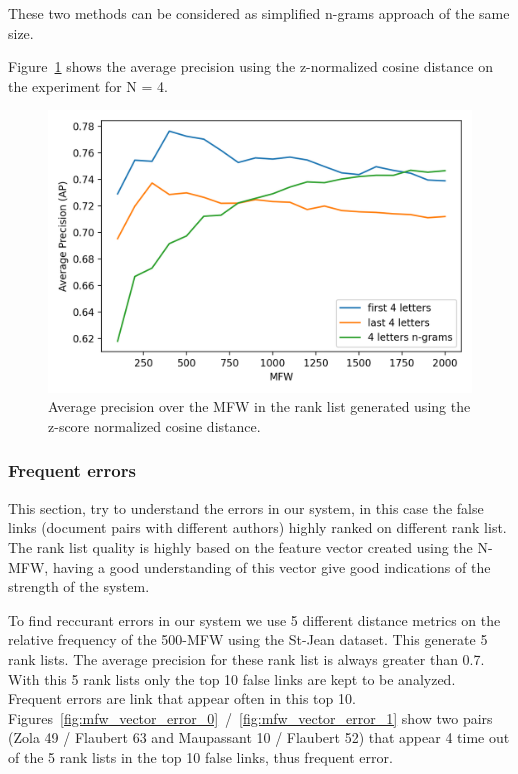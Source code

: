 These two methods can be considered as simplified n-grams approach of the same size.

Figure~\ref{fig:first_last_letters_ngrams} shows the average precision using the z-normalized cosine distance on the experiment for N = 4.

\begin{figure}
  \includegraphics[width=\linewidth]{img/first_last_letters_ngrams.png}
  \caption{Average precision over the MFW in the rank list generated using the z-score normalized cosine distance.}
  \label{fig:first_last_letters_ngrams}
\end{figure}


\subsubsection{Frequent errors}

This section, try to understand the errors in our system, in this case the false links (document pairs with different authors) highly ranked on different rank list.
The rank list quality is highly based on the feature vector created using the N-MFW, having a good understanding of this vector give good indications of the strength of the system.

To find reccurant errors in our system we use 5 different distance metrics on the relative frequency of the 500-MFW using the St-Jean dataset.
This generate 5 rank lists.
The average precision for these rank list is always greater than 0.7.
With this 5 rank lists only the top 10 false links are kept to be analyzed.
Frequent errors are link that appear often in this top 10.
Figures~\ref{fig:mfw_vector_error_0}~/~\ref{fig:mfw_vector_error_1} show two pairs (Zola 49 / Flaubert 63 and Maupassant 10 / Flaubert 52) that appear 4 time out of the 5 rank lists in the top 10 false links, thus frequent error.

